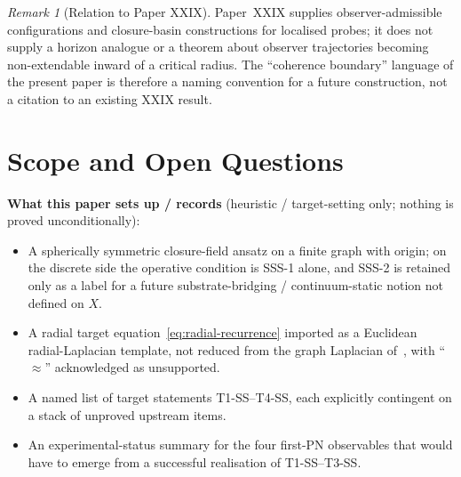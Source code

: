 \documentclass[12pt]{article}
\theoremstyle{definition}
\theoremstyle{remark}
\newtheorem{remark}[theorem]{Remark}
\begin{document}
\begin{remark}[Relation to Paper XXIX]
Paper~XXIX supplies observer-admissible configurations and closure-basin constructions for localised probes; it does not supply a horizon analogue or a theorem about observer trajectories becoming non-extendable inward of a critical radius. The ``coherence boundary'' language of the present paper is therefore a naming convention for a future construction, not a citation to an existing XXIX result.
\end{remark}

\section{Scope and Open Questions}\label{sec:scope}

\textbf{What this paper sets up / records} (heuristic / target-setting only; nothing is proved unconditionally):
\begin{itemize}
\item A spherically symmetric closure-field ansatz on a finite graph with origin; on the discrete side the operative condition is SSS-1 alone, and SSS-2 is retained only as a label for a future substrate-bridging / continuum-static notion not defined on $X$.
\item A radial target equation~\eqref{eq:radial-recurrence} imported as a Euclidean radial-Laplacian template, not reduced from the graph Laplacian of~\citep{SmartXXVII}, with ``$\approx$'' acknowledged as unsupported.
\item A named list of target statements T1-SS--T4-SS, each explicitly contingent on a stack of unproved upstream items.
\item An experimental-status summary for the four first-PN observables that would have to emerge from a successful realisation of T1-SS--T3-SS.
\end{itemize}
\end{document}
